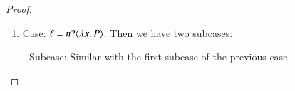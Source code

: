 \begin{proof}
\begin{enumerate}[1.]
	\noi - Subcase: The proof of  implies that
%
	\[
		\horel{\mapt{\Gamma}^{1}}{\mapt{\Delta_1}^{1}}{\pmapp{P_1}{1}{f}}{\hby{\news{\tilde{m_1}'} \bactout{n}{\abs{z}{\binp{z}{x} (\appl{x}{m_1})}}}}{\mapt{\Delta_1'}^{1}}{\pmapp{P_2}{1}{f}}
	\]
%
	\noi implies
%
	\[
		\horel{\Gamma}{\Delta_1}{P_1}{\hby{\news{\tilde{m_1}'} \bactout{n}{m_1}}}{\Delta_1'}{P_2}
	\]
%
	\noi From the latter transition and the definition of $\Re$ we infer both:
%
	\begin{eqnarray}
		&&\horel{\Gamma}{\Delta_2}{Q_1}{\Hby{\news{\tilde{m_2}'} \bactout{n}{m_2}}}{\Delta_2'}{Q_2}
		\label{prop:HOp_to_HO:full_abs3}
	\end{eqnarray}
%
	\noi and
%
	\begin{eqnarray}
		& \Gamma; \es; \Delta_1' & \proves \newsp{\tilde{m_1}'}{P_2 \Par \hotrigger{t}{x}{s}{m_1}} \nonumber \\
		& \hwb & \Delta_2' \proves \newsp{\tilde{m_2}'}{Q_2 \Par \hotrigger{t}{x}{s}{m_2}}
		\label{prop:HOp_to_HO:full_abs4}
	\end{eqnarray}
%
	\noi From~\eqref{prop:HOp_to_HO:full_abs3} and , we obtain:
%
	\[
		\horel{\mapt{\Gamma}^{1}}{\mapt{\Delta_2}^{1}}{\pmapp{Q_1}{1}{f}}{\Hby{\news{\tilde{m_2}'} \bactout{n}{\abs{z}{\binp{z}{x} (\appl{x}{m_2})}}}}{\mapt{\Delta_2'}^{1}}{\pmapp{Q_2}{1}{f}}
	\]
%
	\noi Furthermore, from~\eqref{prop:HOp_to_HO:full_abs4} and the definition of $\Re$ we obtain:
%
	\[
		\mhorel{\mapt{\Gamma}^{1}}{\mapt{\Delta_1'}^{1}}{\pmapp{\newsp{\tilde{m_1}'}{P_2 \Par \hotrigger{t}{x}{s}{m_1}}}{1}{f}}
		{\ \Re\ }{\mapt{\Delta_2'}^{1}}{}{\pmapp{\newsp{\tilde{m_2}'}{Q_2 \Par \hotrigger{t}{x}{s}{m_2}}}{1}{f}}
	\]
%
	\noi as required.

	\item Case: $\ell = n ? \langle \lambda x.\,P \rangle$. Then we have two subcases:

	\noi - Subcase: Similar with the first subcase of the previous case.


\end{enumerate}
\end{proof}

